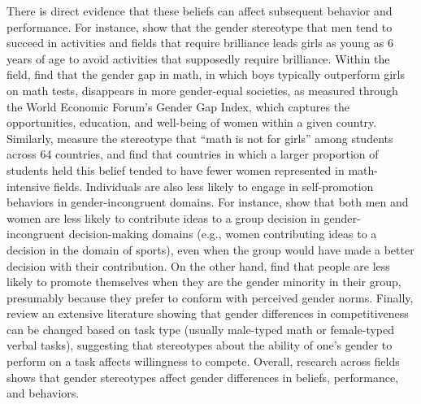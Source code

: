 \documentclass[letterpaper, nobind]{templates/ociamthesis}
\begin{document}
There is direct evidence that these beliefs can affect subsequent behavior and performance. For instance, \textcite{Bian2017} show that the gender stereotype that men tend to succeed in activities and fields that require brilliance leads girls as young as 6 years of age to avoid activities that supposedly require brilliance. Within the field, \textcite{Guiso2008} find that the gender gap in math, in which boys typically outperform girls on math tests, disappears in more gender-equal societies, as measured through the World Economic Forum's Gender Gap Index, which captures the opportunities, education, and well-being of women within a given country. Similarly, \textcite{Breda2020} measure the stereotype that ``math is not for girls'' among students across 64 countries, and find that countries in which a larger proportion of students held this belief tended to have fewer women represented in math-intensive fields. Individuals are also less likely to engage in self-promotion behaviors in gender-incongruent domains. For instance, \textcite{Coffman2014} show that both men and women are less likely to contribute ideas to a group decision in gender-incongruent decision-making domains (e.g., women contributing ideas to a decision in the domain of sports), even when the group would have made a better decision with their contribution. On the other hand, \textcite{Coffman2021a} find that people are less likely to promote themselves when they are the gender minority in their group, presumably because they prefer to conform with perceived gender norms. Finally, \textcite{Niederle2011} review an extensive literature showing that gender differences in competitiveness can be changed based on task type (usually male-typed math or female-typed verbal tasks), suggesting that stereotypes about the ability of one's gender to perform on a task affects willingness to compete. Overall, research across fields shows that gender stereotypes affect gender differences in beliefs, performance, and behaviors.
\end{document}
